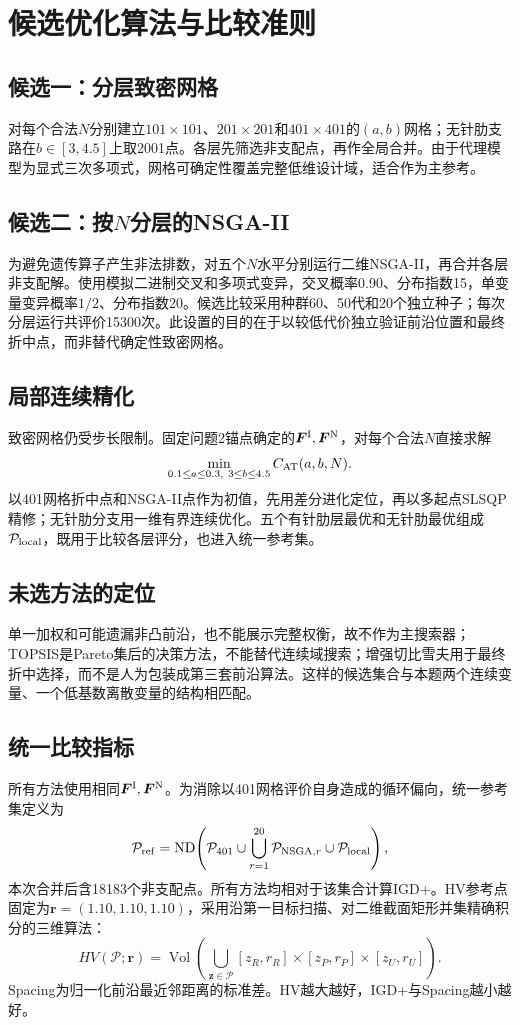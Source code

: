 ﻿\documentclass[UTF8,a4paper,11pt]{ctexart}
\begin{document}
\section{候选优化算法与比较准则}
\subsection{候选一：分层致密网格}
对每个合法$N$分别建立$101\times101$、$201\times201$和$401\times401$的$(a,b)$网格；无针肋支路在$b\in[3,4.5]$上取2001点。各层先筛选非支配点，再作全局合并。由于代理模型为显式三次多项式，网格可确定性覆盖完整低维设计域，适合作为主参考。

\subsection{候选二：按$N$分层的NSGA-II}
为避免遗传算子产生非法排数，对五个$N$水平分别运行二维NSGA-II，再合并各层非支配解。使用模拟二进制交叉和多项式变异，交叉概率0.90、分布指数15，单变量变异概率$1/2$、分布指数20。候选比较采用种群60、50代和20个独立种子；每次分层运行共评价15300次。此设置的目的在于以较低代价独立验证前沿位置和最终折中点，而非替代确定性致密网格。

\subsection{局部连续精化}
致密网格仍受步长限制。固定问题2锚点确定的$\bm F^{\rm I},\bm F^{\rm N}$，对每个合法$N$直接求解
\[
 \min_{0.1\le a\le0.3,\ 3\le b\le4.5}C_{\rm AT}(a,b,N).
\]
以401网格折中点和NSGA-II点作为初值，先用差分进化定位，再以多起点SLSQP精修；无针肋分支用一维有界连续优化。五个有针肋层最优和无针肋最优组成$\mathcal P_{\rm local}$，既用于比较各层评分，也进入统一参考集。

\subsection{未选方法的定位}
单一加权和可能遗漏非凸前沿，也不能展示完整权衡，故不作为主搜索器；TOPSIS是Pareto集后的决策方法，不能替代连续域搜索；增强切比雪夫用于最终折中选择，而不是人为包装成第三套前沿算法。这样的候选集合与本题两个连续变量、一个低基数离散变量的结构相匹配。

\subsection{统一比较指标}
所有方法使用相同$\bm F^{\rm I},\bm F^{\rm N}$。为消除以401网格评价自身造成的循环偏向，统一参考集定义为
\[
 \mathcal P_{\rm ref}=\operatorname{ND}\!\left(
 \mathcal P_{401}\cup\bigcup_{r=1}^{20}\mathcal P_{{\rm NSGA},r}
 \cup\mathcal P_{\rm local}\right),
\]
本次合并后含18183个非支配点。所有方法均相对于该集合计算IGD+。HV参考点固定为$\bm r=(1.10,1.10,1.10)$，采用沿第一目标扫描、对二维截面矩形并集精确积分的三维算法：
\[
HV(\mathcal P;\bm r)=\operatorname{Vol}\!\left(
\bigcup_{\bm z\in\mathcal P}[z_R,r_R]\times[z_P,r_P]\times[z_U,r_U]\right).
\]
Spacing为归一化前沿最近邻距离的标准差。HV越大越好，IGD+与Spacing越小越好。
\end{document}
